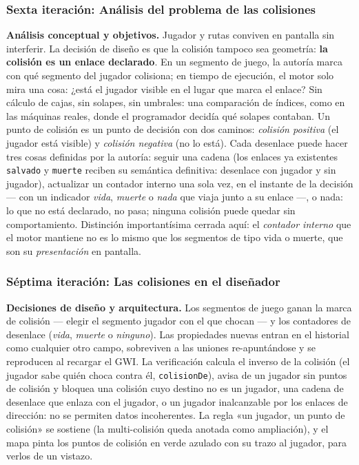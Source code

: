 \subsubsection{Sexta iteración: Análisis del problema de las colisiones}

\textbf{Análisis conceptual y objetivos.} Jugador y rutas conviven en
pantalla sin interferir. La decisión de diseño es que la colisión
tampoco sea geometría: \textbf{la colisión es un enlace declarado}. En
un segmento de juego, la autoría marca con qué segmento del jugador
colisiona; en tiempo de ejecución, el motor solo mira una cosa: ¿está
el jugador visible en el lugar que marca el enlace? Sin cálculo de
cajas, sin solapes, sin umbrales: una comparación de índices, como en
las máquinas reales, donde el programador decidía qué solapes
contaban. Un punto de colisión es un punto de decisión con dos caminos:
\emph{colisión positiva} (el jugador está visible) y \emph{colisión
	negativa} (no lo está). Cada desenlace puede hacer tres cosas definidas
por la autoría: seguir una cadena (los enlaces ya existentes
\texttt{salvado} y \texttt{muerte} reciben su semántica definitiva:
desenlace con jugador y sin jugador), actualizar un contador interno
una sola vez, en el instante de la decisión — con un indicador
\emph{vida}, \emph{muerte} o \emph{nada} que viaja junto a su enlace —,
o nada: lo que no está declarado, no pasa; ninguna colisión puede
quedar sin comportamiento. Distinción importantísima cerrada aquí: el
\emph{contador interno} que el motor mantiene no es lo mismo que los
segmentos de tipo vida o muerte, que son su \emph{presentación} en
pantalla.

\subsubsection{Séptima iteración: Las colisiones en el diseñador}

\textbf{Decisiones de diseño y arquitectura.} Los segmentos de juego
ganan la marca de colisión — elegir el segmento jugador con el que
chocan — y los contadores de desenlace (\emph{vida}, \emph{muerte} o
\emph{ninguno}). Las propiedades nuevas entran en el historial como
cualquier otro campo, sobreviven a las uniones re-apuntándose y se
reproducen al recargar el GWI. La verificación calcula el inverso de
la colisión (el jugador sabe quién choca contra él, \texttt{colisionDe}),
avisa de un jugador sin puntos de colisión y bloquea una colisión cuyo
destino no es un jugador, una cadena de desenlace que enlaza con el
jugador, o un jugador inalcanzable por los enlaces de dirección: no se
permiten datos incoherentes. La regla «un jugador, un punto de
colisión» se sostiene (la multi-colisión queda anotada como ampliación),
y el mapa pinta los puntos de colisión en verde azulado con su trazo
al jugador, para verlos de un vistazo.


